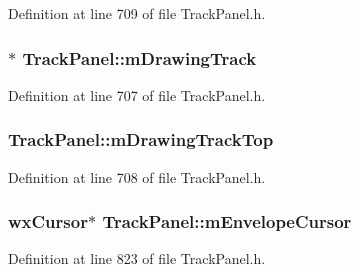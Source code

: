 Definition at line 709 of file Track\+Panel.\+h.

\subsubsection[{\texorpdfstring{m\+Drawing\+Track}{mDrawingTrack}}]{$\ast$ Track\+Panel\+::m\+Drawing\+Track\hspace{0.3cm}{\ttfamily [protected]}}\hypertarget{class_track_panel_a9e072ae51c9cfe5637a5aca0ddbe1251}{}\label{class_track_panel_a9e072ae51c9cfe5637a5aca0ddbe1251}


Definition at line 707 of file Track\+Panel.\+h.

\subsubsection[{\texorpdfstring{m\+Drawing\+Track\+Top}{mDrawingTrackTop}}]{ Track\+Panel\+::m\+Drawing\+Track\+Top\hspace{0.3cm}{\ttfamily [protected]}}\hypertarget{class_track_panel_af2d95ea945c2e60af2e7277a09dc5317}{}\label{class_track_panel_af2d95ea945c2e60af2e7277a09dc5317}


Definition at line 708 of file Track\+Panel.\+h.

\subsubsection[{\texorpdfstring{m\+Envelope\+Cursor}{mEnvelopeCursor}}]{\setlength{\rightskip}{0pt plus 5cm}wx\+Cursor$\ast$ Track\+Panel\+::m\+Envelope\+Cursor\hspace{0.3cm}{\ttfamily [protected]}}\hypertarget{class_track_panel_ae120daf4a0e3c0249ab1a98094edff28}{}\label{class_track_panel_ae120daf4a0e3c0249ab1a98094edff28}


Definition at line 823 of file Track\+Panel.\+h.

